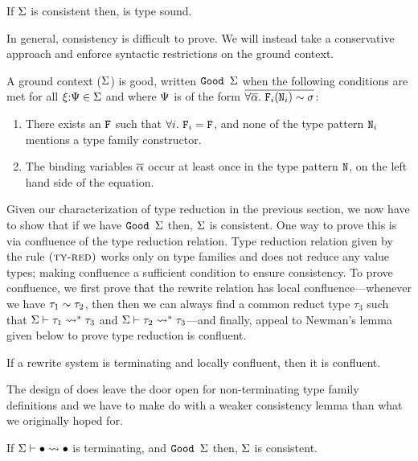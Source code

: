 \documentclass[format=acmsmall,manuscript,review,screen,nonacm,margin=1in,11pt]{acmart}
\begin{document}
\begin{lemma}
  If $\Sigma$ is consistent then, \CLTF is type sound.
\end{lemma}
In general, consistency is difficult to prove. We will instead take a conservative approach
and enforce syntactic restrictions on the ground context.
\begin{defn}[$\Good~\GEnv$]\label{def:good-ctx}
  A ground context ($\Sigma$) is good, written $\texttt{Good }\Sigma$ when
  the following conditions are met for all $\xi{:}\Psi\in\Sigma$ and
  where $\Psi$ is of the form $\overline{\forall\overline{\alpha}.~\texttt{F}_i(\texttt{N}_i)\mathrel{\sim}\sigma}$:
  \begin{enumerate}
  \item There exists an $\texttt{F}$ such that  $\forall i.~\texttt{F}_i = \texttt{F}$,
    and none of the type pattern $\texttt{N}_i$ mentions a type family constructor.
  \item The binding variables $\overline{\alpha}$ occur at least once in the type pattern $\texttt{N}$,
    on the left hand side of the equation.
  \end{enumerate}
\end{defn}
Given our characterization of type reduction in the previous section, we now have to show
that if we have $\texttt{Good }\Sigma$ then, $\Sigma$ is consistent. One way to prove this is
via confluence of the type reduction relation. Type reduction relation given by the rule $\textsc{(ty-red)}$
works only on type families and does not reduce any value types; making 
confluence a sufficient condition to ensure consistency. To prove confluence, we first prove that the
rewrite relation has local confluence---whenever we have ${\tau_1}\mathrel{\sim}{\tau_2}$, then 
then we can always find a common reduct type $\tau_3$ such that $\Sigma \vdash \tau_1 \rightsquigarrow^* \tau_3$ and
$\Sigma \vdash \tau_2 \rightsquigarrow^* \tau_3$---and finally, appeal to Newman's lemma\cite{newman_theories_1942} given below
to prove type reduction is confluent.
\begin{lemma}[Newman]
  If a rewrite system is terminating and locally confluent, then it is confluent.
\end{lemma}
The design of \CLTF does leave the door open for non-terminating type family definitions and 
we have to make do with a weaker consistency lemma than what we originally hoped for.
\begin{lemma}
  If $\Sigma \vdash \bullet \rightsquigarrow \bullet$ is terminating, and $\texttt{Good }\Sigma$ then, $\Sigma$ is consistent.
\end{lemma}
\end{document}
